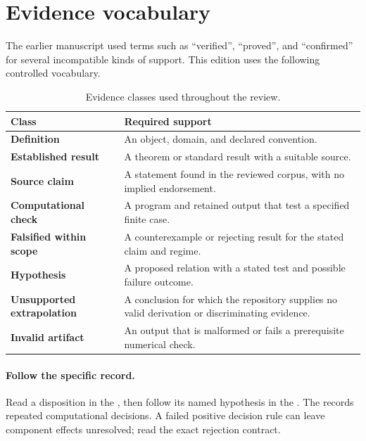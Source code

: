 \section{Evidence vocabulary}

The earlier manuscript used terms such as \enquote{verified}, \enquote{proved},
and \enquote{confirmed} for several incompatible kinds of support. This edition
uses the following controlled vocabulary.

\begin{table}[htbp]
  \centering
  \caption{Evidence classes used throughout the review.}
  \label{tab:evidence-classes}
  \begin{tabularx}{\textwidth}{>{\raggedright\arraybackslash\bfseries}p{}Y}
    \toprule
    Class & Required support \\
    \midrule
    Definition & An object, domain, and declared convention. \\
    Established result & A theorem or standard result with a suitable source. \\
    Source claim & A statement found in the reviewed corpus, with no implied endorsement. \\
    Computational check & A program and retained output that test a specified finite case. \\
    Falsified within scope & A counterexample or rejecting result for the stated claim and regime. \\
    Hypothesis & A proposed relation with a stated test and possible failure outcome. \\
    Unsupported extrapolation & A conclusion for which the repository supplies no valid derivation or discriminating evidence. \\
    Invalid artifact & An output that is malformed or fails a prerequisite numerical check. \\
    \bottomrule
  \end{tabularx}
\end{table}

\paragraph{Follow the specific record.}
Read a disposition in the , then follow its named hypothesis in the
. The
records repeated computational decisions. A failed positive decision rule can
leave component effects unresolved; read the exact rejection contract.

